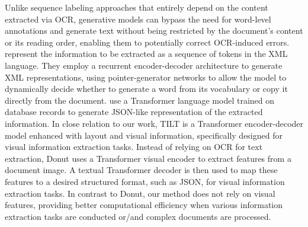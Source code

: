Unlike sequence labeling approaches that entirely depend on the content extracted via \ac{OCR}, generative models can bypass the need for word-level annotations and generate text without being restricted by the document's content or its reading order, enabling them to potentially correct \ac{OCR}-induced errors. \citet{sage2020end} represent the information to be extracted as a sequence of tokens in the XML language. They employ a recurrent encoder-decoder architecture to generate XML representations, using pointer-generator networks \citep{see2017get} to allow the model to dynamically decide whether to generate a word from its vocabulary or copy it directly from the document. \citet{townsend2021doc2dict} use a Transformer \citep{vaswani2017attention} language model trained on database records to generate JSON-like representation of the extracted information. In close relation to our work, TILT \citep{powalski2021going} is a Transformer encoder-decoder model enhanced with layout and visual information, specifically designed for visual information extraction tasks. Instead of relying on \ac{OCR} for text extraction, Donut \citep{kim2022ocr} uses a Transformer visual encoder to extract features from a document image. A textual Transformer decoder is then used to map these features to a desired structured format, such as JSON, for visual information extraction tasks. In contrast to Donut, our method does not rely on visual features, providing better computational efficiency when various information extraction tasks are conducted or/and complex documents are processed. \\


